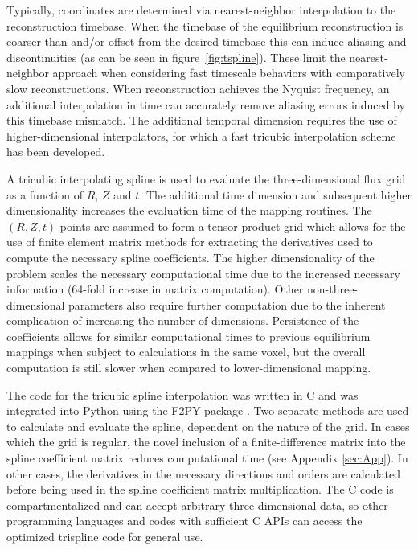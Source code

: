 \documentclass{elsarticle}
\begin{document}
Typically, coordinates are determined via nearest-neighbor interpolation to the reconstruction timebase.
When the timebase of the equilibrium reconstruction is coarser than and/or offset from the desired timebase this can induce aliasing and discontinuities (as can be seen in figure~\ref{fig:tspline}). 
These limit the nearest-neighbor approach when considering fast timescale behaviors with comparatively slow reconstructions.  
When reconstruction achieves the Nyquist frequency, an additional interpolation in time can accurately remove aliasing errors induced by this timebase mismatch. 
The additional temporal dimension requires the use of higher-dimensional interpolators, for which a fast tricubic interpolation scheme has been developed. 

A tricubic interpolating spline \cite{Lekien2005} is used to evaluate the three-dimensional flux grid as a function of $R$, $Z$ and $t$. 
The additional time dimension and subsequent higher dimensionality increases the evaluation time of the mapping routines. 
The $(R, Z, t)$ points are assumed to form a tensor product grid which allows for the use of finite element matrix methods for extracting the derivatives used to compute the necessary spline coefficients. 
The higher dimensionality of the problem scales the necessary computational time due to the increased necessary information (64-fold increase in matrix computation). 
Other non-three-dimensional parameters also require further computation due to the inherent complication of increasing the number of dimensions. 
Persistence of the coefficients allows for similar computational times to previous equilibrium mappings when subject to calculations in the same voxel, but the overall computation is still slower when compared to lower-dimensional mapping.

The code for the tricubic spline interpolation was written in C and was integrated into Python using the F2PY package  \cite{Peterson2009}. Two separate methods are used to calculate and evaluate the spline, dependent on the nature of the grid.  
In cases which the grid is regular, the novel inclusion of a finite-difference matrix into the spline coefficient matrix reduces computational time (see Appendix \ref{sec:App}).  
In other cases, the derivatives in the necessary directions and orders are calculated before being used in the spline coefficient matrix multiplication.
The C code is compartmentalized and can accept arbitrary three dimensional data, so other programming languages and codes with sufficient C APIs can access the optimized trispline code for general use.
\end{document}
